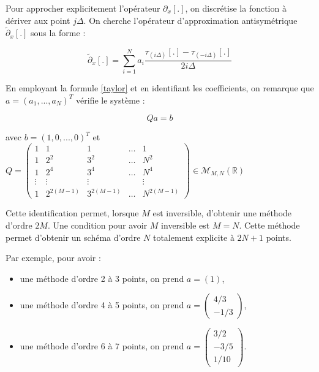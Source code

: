 \documentclass[10pt,a4paper]{amsart}
\begin{document}
Pour approcher explicitement l'opérateur $\partial_x \left[ . \right]$, on discrétise la fonction à dériver aux point $j\Delta$. On cherche l'opérateur d'approximation antisymétrique  $\tilde{\partial}_x \left[ . \right]$ sous la forme :

\begin{equation}\label{op_classique}
\tilde{\partial}_x \left[ . \right] = \sum_{i=1}^{N} a_i \dfrac{\tau_{(i\Delta)} \left[ . \right] - \tau_{(-i\Delta)} \left[ . \right]}{2i \Delta}
\end{equation}

En employant la formule \eqref{taylor} et en identifiant les coefficients, on remarque que $a=(a_1, ..., a_N)^T$ vérifie le système :

\begin{equation}\label{systeme_op_classique}
Qa=b
\end{equation}

avec $b=(1, 0, ..., 0)^T$ et 
$Q=\begin{pmatrix}
1 & 1   & 1   & \ldots & 1   \\ 
1 & 2^2 & 3^2 & \ldots & N^2 \\ 
1 & 2^4 & 3^4 & \ldots & N^4 \\ 
\vdots & \vdots & \vdots &  & \vdots \\ 
1 & 2^{2(M-1)} & 3^{2(M-1)} & \ldots & N^{2(M-1)}
\end{pmatrix} \in \mathcal{M}_{M,N}\left( \mathbb{R} \right)$

Cette identification permet, lorsque $M$ est inversible, d'obtenir une méthode d'ordre $2M$. Une condition pour avoir $M$ inversible est $M=N$. Cette méthode permet d'obtenir un schéma d'ordre $N$ totalement explicite à $2N+1$ points. 

Par exemple, pour avoir :

\begin{itemize}
\item une méthode d'ordre 2 à 3 points, on prend $a = \left( 1 \right)$,\\

\item une méthode d'ordre 4 à 5 points, on prend $a = \begin{pmatrix}
4/3 \\ -1/3
\end{pmatrix}$,\\

\item une méthode d'ordre 6 à 7 points, on prend $a = \begin{pmatrix}
3/2 \\ -3/5 \\ 1/10
\end{pmatrix}$.

\end{itemize} 
\end{document}
